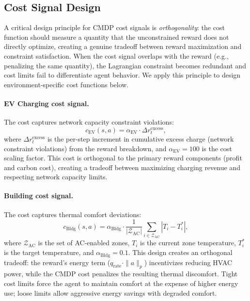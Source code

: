 \subsection{Cost Signal Design}
\label{sec:cost_signals}

A critical design principle for CMDP cost signals is \emph{orthogonality}: the cost function should measure a quantity that the unconstrained reward does not directly optimize, creating a genuine tradeoff between reward maximization and constraint satisfaction. When the cost signal overlaps with the reward (e.g., penalizing the same quantity), the Lagrangian constraint becomes redundant and cost limits fail to differentiate agent behavior. We apply this principle to design environment-specific cost functions below.

\paragraph{EV Charging cost signal.} The cost captures network capacity constraint violations:
\begin{equation}
    c_{\text{EV}}(s, a) = \alpha_{\text{EV}} \cdot \Delta r_t^{\text{excess}},
    \label{eq:ev_cost}
\end{equation}
where $\Delta r_t^{\text{excess}}$ is the per-step increment in cumulative excess charge (network constraint violations) from the reward breakdown, and $\alpha_{\text{EV}} = 100$ is the cost scaling factor. This cost is orthogonal to the primary reward components (profit and carbon cost), creating a tradeoff between maximizing charging revenue and respecting network capacity limits.

\paragraph{Building cost signal.} The cost captures thermal comfort deviations:
\begin{equation}
    c_{\text{Bldg}}(s, a) = \alpha_{\text{Bldg}} \cdot \frac{1}{|\mathcal{Z}_{\text{AC}}|} \sum_{i \in \mathcal{Z}_{\text{AC}}} |T_i - T_i^*|,
    \label{eq:bldg_cost}
\end{equation}
where $\mathcal{Z}_{\text{AC}}$ is the set of AC-enabled zones, $T_i$ is the current zone temperature, $T_i^*$ is the target temperature, and $\alpha_{\text{Bldg}} = 0.1$. This design creates an orthogonal tradeoff: the reward's energy term ($q_{\text{rate}} \cdot \|a\|_p$) incentivizes reducing HVAC power, while the CMDP cost penalizes the resulting thermal discomfort. Tight cost limits force the agent to maintain comfort at the expense of higher energy use; loose limits allow aggressive energy savings with degraded comfort.

